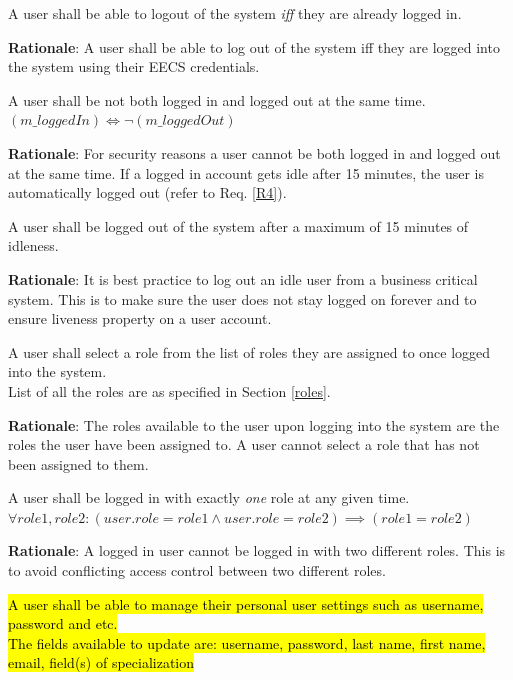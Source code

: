 \documentclass[fontsize=12pt,paper=letter,twoside]{scrartcl}
\begin{document}
\genreq
{A user shall be able to logout of the system \emph{iff} they are already logged in.\\}
{}
\label{R2}

\smallskip
\noindent \textbf{Rationale}: A user shall be able to log out of the system iff they are logged into the system using their EECS credentials.

\rdescription
{A user shall be not both logged in and logged out at the same time.\\}
{$(m\_loggedIn) \iff \neg (m\_loggedOut)$}
\label{R3}

\smallskip
\noindent \textbf{Rationale}: For security reasons a user cannot be both logged in and logged out at the same time. If a logged in account gets idle after 15 minutes, the user is automatically logged out (refer to Req. \ref{R4}).

\genreq
{A user shall be logged out of the system after a maximum of 15 minutes of idleness.\\}
{}
\label{R4}

\smallskip
\noindent \textbf{Rationale}: It is best practice to log out an idle user from a business critical system. This is to make sure the user does not stay logged on forever and to ensure liveness property on a user account.

\rdescription
{A user shall select a role from the list of roles they are assigned to once logged into the system.\\}
{List of all the roles are as specified in Section \ref{roles}.}
\label{R5}

\smallskip
\noindent \textbf{Rationale}: The roles available to the user upon logging into the system are the roles the user have been assigned to. A user cannot select a role that has not been assigned to them.

\rdescription
{A user shall be logged in with exactly \emph{one} role at any given time.\\}
{$\forall role1, role2 : (user.role = role1 \land user.role = role2) \implies (role1 = role2)$}
\label{R6}

\smallskip
\noindent \textbf{Rationale}: A logged in user cannot be logged in with two different roles. This is to avoid conflicting access control between two different roles.

\rdescription
{\hl{A user shall be able to manage their personal user settings such as username, password and etc.}\\}
{\hl{The fields available to update are: username, password, last name, first name, email, field(s) of specialization}}
\end{document}
